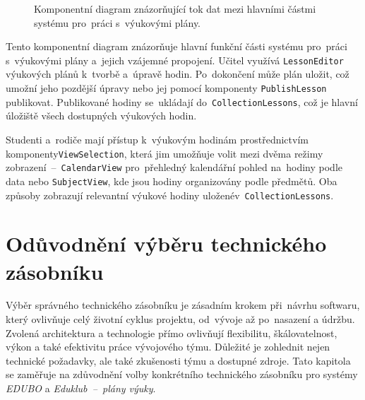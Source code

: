 \documentclass[male,czech,api_bc]{kitheses}
\begin{document}
\begin{figure}[H]
	\centering
	\caption{Komponentní diagram znázorňující tok dat mezi hlavními částmi systému pro~práci s~výukovými plány.}
	\label{fig:component-diagram}
\end{figure}

Tento komponentní diagram znázorňuje hlavní funkční části systému pro~práci s~výukovými plány a~jejich vzájemné propojení. Učitel využívá \texttt{LessonEditor} výukových plánů k~tvorbě a~úpravě hodin. Po~dokončení může plán uložit, což umožní jeho pozdější úpravy nebo jej pomocí komponenty \texttt{PublishLesson} publikovat. Publikované hodiny se~ukládají do~\texttt{CollectionLessons}, což je hlavní úložiště všech dostupných výukových hodin.

Studenti a~rodiče mají přístup k~výukovým hodinám prostřednictvím komponenty\break\texttt{ViewSelection}, která jim umožňuje volit mezi dvěma režimy zobrazení~--~\texttt{CalendarView} pro~přehledný kalendářní pohled na~hodiny podle data nebo \texttt{SubjectView}, kde jsou hodiny organizovány podle předmětů. Oba způsoby zobrazují relevantní výukové hodiny uložené\break v~\texttt{CollectionLessons}.



\section{Odůvodnění výběru technického zásobníku}

Výběr správného technického zásobníku je zásadním krokem při~návrhu softwaru, který ovlivňuje celý životní cyklus projektu, od~vývoje až po~nasazení a údržbu. Zvolená architektura a technologie přímo ovlivňují flexibilitu, škálovatelnost, výkon a také efektivitu práce vývojového týmu. Důležité je zohlednit nejen technické požadavky, ale také zkušenosti týmu a dostupné zdroje. Tato kapitola se zaměřuje na zdůvodnění volby konkrétního technického zásobníku pro systémy \textit{EDUBO} a \textit{Eduklub~--~plány výuky}.
\end{document}
